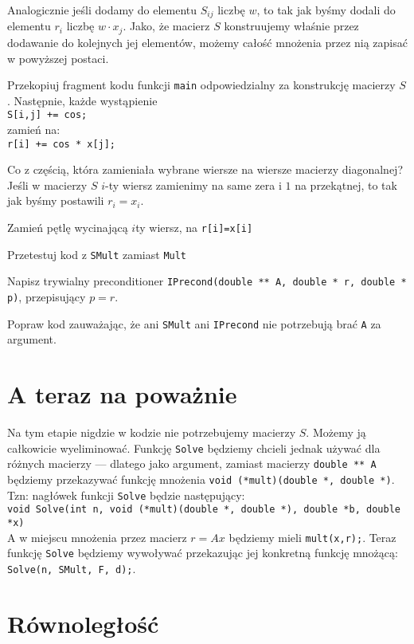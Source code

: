 \documentclass{instrukcja}
\begin{document}
Analogicznie jeśli dodamy do elementu $S_{ij}$ liczbę $w$, to tak jak byśmy dodali do elementu $r_i$ liczbę $w\cdot x_j$. Jako, że macierz $S$ konstruujemy właśnie przez dodawanie do kolejnych jej elementów, możemy całość mnożenia przez nią zapisać w powyższej postaci.

\begin{zad}Przekopiuj fragment kodu funkcji {\tt main} odpowiedzialny za konstrukcję macierzy $S$. Następnie, każde wystąpienie\\
{\tt S[i,j] += cos;}\\
zamień na:\\
{\tt r[i] += cos * x[j];}\end{zad}

Co z częścią, która zamieniała wybrane wiersze na wiersze macierzy diagonalnej? Jeśli w macierzy $S$ $i$-ty wiersz zamienimy na same zera i $1$ na przekątnej, to tak jak byśmy postawili $r_i = x_i$.

\begin{zad}Zamień pętlę wycinającą $i$ty wiersz, na {\tt r[i]=x[i]}\end{zad}
\begin{zad}Przetestuj kod z {\tt SMult} zamiast {\tt Mult}\end{zad}
\begin{zad}Napisz trywialny preconditioner {\tt IPrecond(double ** A, double * r, double * p)}, przepisujący $p=r$.\end{zad}
\begin{zad}Popraw kod zauważając, że ani {\tt SMult} ani {\tt IPrecond} nie potrzebują brać {\tt A} za argument.\end{zad}

\section{A teraz na poważnie}

Na tym etapie nigdzie w kodzie nie potrzebujemy macierzy $S$. Możemy ją całkowicie wyeliminować. Funkcję {\tt Solve} będziemy chcieli jednak używać dla różnych macierzy --- dlatego jako argument, zamiast macierzy {\tt double ** A} będziemy przekazywać funkcję mnożenia {\tt void (*mult)(double *, double *)}. Tzn: nagłówek funkcji {\tt Solve} będzie następujący:\\
{\tt void Solve(int n, void (*mult)(double *, double *), double *b, double *x)}\\
A w miejscu mnożenia przez macierz $r=Ax$ będziemy mieli {\tt mult(x,r);}. Teraz funkcję {\tt Solve} będziemy wywoływać przekazując jej konkretną funkcję mnożącą: {\tt Solve(n, SMult, F, d);}.

\section{Równoległość}
\end{document}

